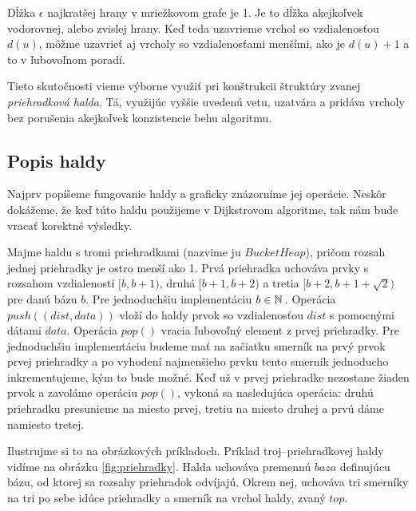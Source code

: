 \begin{example}
\label{ex:range}
Dĺžka $\epsilon$ najkratšej hrany v mriežkovom grafe je 1. Je to dĺžka akejkoľvek vodorovnej, alebo zvislej hrany.
Keď teda uzavrieme vrchol so vzdialenosťou $d(u)$, môžme uzavrieť aj vrcholy so vzdialenosťami menšími, ako je $d(u) + 1$ a to v ľubovoľnom poradí.
\end{example}

Tieto skutočnosti vieme výborne využiť pri konštrukcii štruktúry
zvanej {\sl priehradková halda}. Tá, využijúc vyššie uvedenú vetu, uzatvára a pridáva vrcholy bez porušenia akejkoľvek konzistencie behu algoritmu.

\subsection{Popis haldy}
Najprv popíšeme fungovanie haldy a graficky znázorníme jej 
operácie. Neskôr dokážeme, že keď túto haldu použijeme v Dijkstrovom algoritme, tak nám bude vracať korektné výsledky.

Majme haldu s tromi priehradkami (nazvime ju $BucketHeap$), pričom rozsah jednej priehradky je ostro menší ako 1.
Prvá priehradka uchováva prvky s rozsahom vzdialeností
$ [b, b+1) $, druhá $ [b+1, b+2) $ a tretia $ [b+2, b+1+\sqrt{2}) $
pre danú bázu $ b $. Pre jednoduchšiu implementáciu $b \in \mathbb{N}\,$. Operácia $push((dist, data))$ vloží do haldy prvok so vzdialenosťou $dist$ 
s pomocnými dátami $data$. Operácia $pop()$ vracia ľubovoľný element z prvej priehradky. 
Pre jednoduchšiu implementáciu budeme mať na začiatku smerník na prvý prvok prvej priehradky a po vyhodení najmenšieho prvku tento smerník jednoducho inkrementujeme, kým to bude možné. Keď už v prvej priehradke nezostane žiaden prvok a zavoláme operáciu $pop()$, vykoná sa nasledujúca operácia: druhú priehradku presunieme na miesto prvej, tretiu na miesto druhej a prvú dáme namiesto tretej.

Ilustrujme si to na obrázkových príkladoch. Príklad troj--priehradkovej haldy vidíme na obrázku \ref{fig:priehradky}.
Halda uchováva premennú $ baza $ definujúcu bázu, od ktorej sa rozsahy priehradok odvíjajú. Okrem
nej, uchováva tri smerníky na tri po sebe idúce priehradky a smerník na vrchol haldy, zvaný $ top $.



